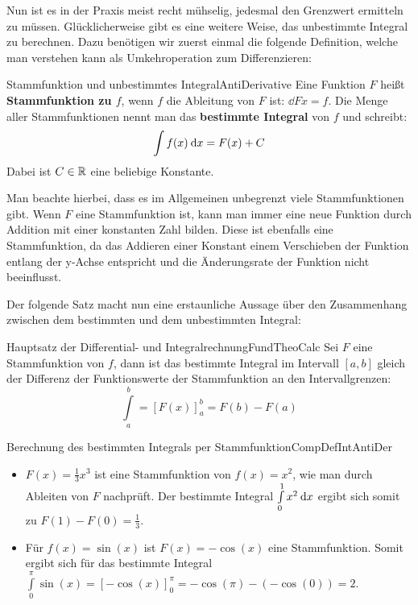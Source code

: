 Nun ist es in der Praxis meist recht mühselig, jedesmal den Grenzwert ermitteln zu müssen. Glücklicherweise gibt es eine weitere Weise, das unbestimmte Integral zu berechnen. Dazu benötigen wir zuerst einmal die folgende Definition, welche man verstehen kann als Umkehroperation zum Differenzieren:

\begin{definition}{Stammfunktion und unbestimmtes Integral}{AntiDerivative}
    Eine Funktion $F$ heißt \textbf{Stammfunktion zu $f$}, wenn $f$ die Ableitung von $F$ ist: $\dd{F}{x} = f$. Die Menge aller Stammfunktionen nennt man das \textbf{bestimmte Integral} von $f$ und schreibt:
    $$
        \int f(x) \:\mathrm{d}{x} = F(x) + C
    $$
    Dabei ist $C \in \mathbb{R}$ eine beliebige Konstante.
\end{definition}

Man beachte hierbei, dass es im Allgemeinen unbegrenzt viele Stammfunktionen gibt. Wenn $F$ eine Stammfunktion ist, kann man immer eine neue Funktion durch Addition mit einer konstanten Zahl bilden. Diese ist ebenfalls eine Stammfunktion, da das Addieren einer Konstant einem Verschieben der Funktion entlang der y-Achse entspricht und die Änderungsrate der Funktion nicht beeinflusst.

Der folgende Satz macht nun eine erstaunliche Aussage über den Zusammenhang zwischen dem bestimmten und dem unbestimmten Integral:

\begin{definition}{Hauptsatz der Differential- und Integralrechnung}{FundTheoCalc}
    Sei $F$ eine Stammfunktion von $f$, dann ist das bestimmte Integral im Intervall $[a,b]$  gleich der Differenz der Funktionswerte der Stammfunktion an den Intervallgrenzen:
    $$
        \int\limits_a^b = \left[F(x)\right]_a^b = F(b) - F(a)
    $$
\end{definition}

\begin{example}{Berechnung des bestimmten Integrals per Stammfunktion}{CompDefIntAntiDer}
    \begin{itemize}
        \item $F(x) = \frac{1}{3}x^3$ ist eine Stammfunktion von $f(x)=x^2$, wie man durch Ableiten von $F$ nachprüft. Der bestimmte Integral $\int\limits_0^1 x^2 \:\mathrm{d}{x}$ ergibt sich somit zu $F(1)-F(0) = \frac{1}{3}$.
        \item Für $f(x) = \sin(x)$ ist $F(x) = -\cos(x)$ eine Stammfunktion. Somit ergibt sich für das bestimmte Integral $\int\limits_0^\pi \sin(x) = \left[-\cos(x)\right]_0^\pi = -\cos(\pi) - (-\cos(0)) = 2$.
    \end{itemize}
\end{example}

